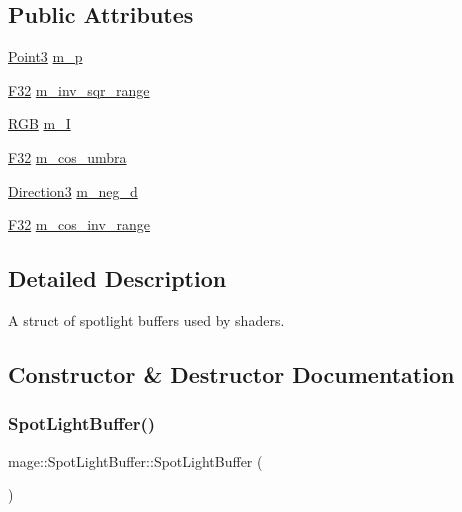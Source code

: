 \subsection*{Public Attributes}
\begin{DoxyCompactItemize}
\item 
\hyperlink{structmage_1_1_point3}{Point3} \hyperlink{structmage_1_1_spot_light_buffer_a6cb32b6089b90aa937df99bb794884e3}{m\+\_\+p}
\item 
\hyperlink{namespacemage_aa97e833b45f06d60a0a9c4fc22ae02c0}{F32} \hyperlink{structmage_1_1_spot_light_buffer_ab4039d0e1761aba882126c8fd34f309c}{m\+\_\+inv\+\_\+sqr\+\_\+range}
\item 
\hyperlink{structmage_1_1_r_g_b}{R\+GB} \hyperlink{structmage_1_1_spot_light_buffer_a1a119e91bb6ab012b8b9453d62fd8231}{m\+\_\+I}
\item 
\hyperlink{namespacemage_aa97e833b45f06d60a0a9c4fc22ae02c0}{F32} \hyperlink{structmage_1_1_spot_light_buffer_a7f12f0a2f82b99253e4ae9aff259b3ed}{m\+\_\+cos\+\_\+umbra}
\item 
\hyperlink{structmage_1_1_direction3}{Direction3} \hyperlink{structmage_1_1_spot_light_buffer_ae0baddd8256464e3cdf91a766f9bf143}{m\+\_\+neg\+\_\+d}
\item 
\hyperlink{namespacemage_aa97e833b45f06d60a0a9c4fc22ae02c0}{F32} \hyperlink{structmage_1_1_spot_light_buffer_a8d2f3b3ba07a93aaf20de1a59124b9a3}{m\+\_\+cos\+\_\+inv\+\_\+range}
\end{DoxyCompactItemize}


\subsection{Detailed Description}
A struct of spotlight buffers used by shaders. 

\subsection{Constructor \& Destructor Documentation}
\hypertarget{structmage_1_1_spot_light_buffer_a862141be0a9dfe1fd3117141924650d5}{}\label{structmage_1_1_spot_light_buffer_a862141be0a9dfe1fd3117141924650d5} 
\subsubsection{\texorpdfstring{Spot\+Light\+Buffer()}{SpotLightBuffer()}\hspace{0.1cm}{\footnotesize\ttfamily [1/3]}}
{\footnotesize\ttfamily mage\+::\+Spot\+Light\+Buffer\+::\+Spot\+Light\+Buffer (\begin{DoxyParamCaption}{ }\end{DoxyParamCaption})}

